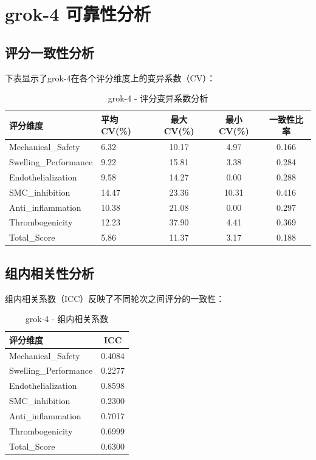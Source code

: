 \documentclass[12pt,a4paper]{article}
\begin{document}
\newpage


\section{grok-4 可靠性分析}

\subsection{评分一致性分析}

下表显示了grok-4在各个评分维度上的变异系数（CV）：

\begin{table}[H]
\centering
\caption{grok-4 - 评分变异系数分析}
\begin{tabular}{llccc}
\toprule
\textbf{评分维度} & \textbf{平均CV(\%)} & \textbf{最大CV(\%)} & \textbf{最小CV(\%)} & \textbf{一致性比率} \\
\midrule
Mechanical\_Safety & 6.32 & 10.17 & 4.97 & 0.166 \\
Swelling\_Performance & 9.22 & 15.81 & 3.38 & 0.284 \\
Endothelialization & 9.58 & 14.27 & 0.00 & 0.288 \\
SMC\_inhibition & 14.47 & 23.36 & 10.31 & 0.416 \\
Anti\_inflammation & 10.38 & 21.08 & 0.00 & 0.297 \\
Thrombogenicity & 12.23 & 37.90 & 4.41 & 0.369 \\
Total\_Score & 5.86 & 11.37 & 3.17 & 0.188 \\
\bottomrule
\end{tabular}
\end{table}

\subsection{组内相关性分析}

组内相关系数（ICC）反映了不同轮次之间评分的一致性：

\begin{table}[H]
\centering
\caption{grok-4 - 组内相关系数}
\begin{tabular}{lc}
\toprule
\textbf{评分维度} & \textbf{ICC} \\
\midrule
Mechanical\_Safety & 0.4084 \\
Swelling\_Performance & 0.2277 \\
Endothelialization & 0.8598 \\
SMC\_inhibition & 0.2300 \\
Anti\_inflammation & 0.7017 \\
Thrombogenicity & 0.6999 \\
Total\_Score & 0.6300 \\
\bottomrule
\end{tabular}
\end{table}
\end{document}

